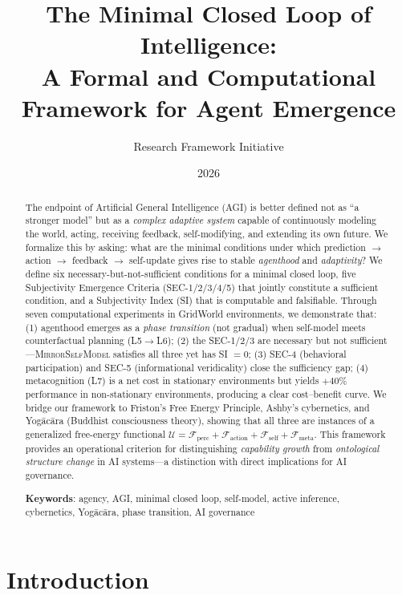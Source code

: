 \documentclass[11pt,a4paper]{article}
\title{The Minimal Closed Loop of Intelligence:\\A Formal and Computational Framework for Agent Emergence}
\author{Research Framework Initiative}
\date{2026}
\begin{document}
\maketitle

\begin{abstract}
The endpoint of Artificial General Intelligence (AGI) is better defined not as ``a stronger model'' but as a \emph{complex adaptive system} capable of continuously modeling the world, acting, receiving feedback, self-modifying, and extending its own future. We formalize this by asking: what are the minimal conditions under which prediction $\to$ action $\to$ feedback $\to$ self-update gives rise to stable \emph{agenthood} and \emph{adaptivity}? We define six necessary-but-not-sufficient conditions for a minimal closed loop, five Subjectivity Emergence Criteria (SEC-1/2/3/4/5) that jointly constitute a sufficient condition, and a Subjectivity Index (SI) that is computable and falsifiable. Through seven computational experiments in GridWorld environments, we demonstrate that: (1) agenthood emerges as a \emph{phase transition} (not gradual) when self-model meets counterfactual planning (L5$\to$L6); (2) the SEC-1/2/3 are necessary but not sufficient---\textsc{MirrorSelfModel} satisfies all three yet has SI $=0$; (3) SEC-4 (behavioral participation) and SEC-5 (informational veridicality) close the sufficiency gap; (4) metacognition (L7) is a net cost in stationary environments but yields $+40\%$ performance in non-stationary environments, producing a clear cost--benefit curve. We bridge our framework to Friston's Free Energy Principle, Ashby's cybernetics, and Yog\={a}c\={a}ra (Buddhist consciousness theory), showing that all three are instances of a generalized free-energy functional $\mathcal{U} = \mathcal{F}_{\text{perc}} + \mathcal{F}_{\text{action}} + \mathcal{F}_{\text{self}} + \mathcal{F}_{\text{meta}}$. This framework provides an operational criterion for distinguishing \emph{capability growth} from \emph{ontological structure change} in AI systems---a distinction with direct implications for AI governance.

\bigskip
\noindent\textbf{Keywords}: agency, AGI, minimal closed loop, self-model, active inference, cybernetics, Yog\={a}c\={a}ra, phase transition, AI governance
\end{abstract}

\section{Introduction}
\end{document}
